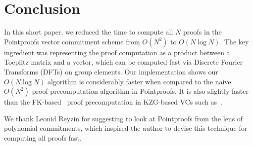 \section{Conclusion}
In this short paper, we reduced the time to compute all $N$ proofs in the Pointproofs vector commitment scheme from $O(N^2)$ to $O(N\log{N})$.
The key ingredient was representing the proof computation as a product between a Toeplitz matrix and a vector, which can be computed fast via Discrete Fourier Transforms (DFTs) on group elements.
Our implementation shows our $O(N\log{N})$ algorithm is considerably faster when compared to the naive $O(N^2)$ proof precomputation algorithm in Pointproofs.
It is also slightly faster than the FK-based~\cite{FK20} proof precomputation in KZG-based VCs such as~\cite{TAB+20}.

We thank Leonid Reyzin for suggesting to look at Pointproofs from the lens of polynomial commitments, which inspired the author to devise this technique for computing all proofs fast.